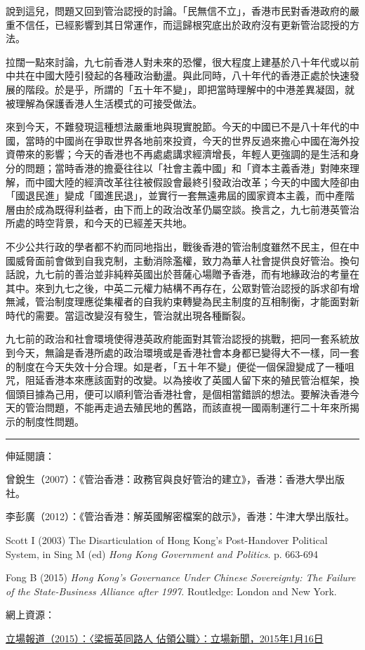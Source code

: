 說到這兒，問題又回到管治認授的討論。「民無信不立」，香港市民對香港政府的嚴重不信任，已經影響到其日常運作，而這歸根究底出於政府沒有更新管治認授的方法。

拉闊一點來討論，九七前香港人對未來的恐懼，很大程度上建基於八十年代或以前中共在中國大陸引發起的各種政治動盪。與此同時，八十年代的香港正處於快速發展的階段。於是乎，所謂的「五十年不變」，即把當時理解中的中港差異凝固，就被理解為保護香港人生活模式的可接受做法。

來到今天，不難發現這種想法嚴重地與現實脫節。今天的中國已不是八十年代的中國，當時的中國尚在爭取世界各地前來投資，今天的世界反過來擔心中國在海外投資帶來的影響；今天的香港也不再處處講求經濟增長，年輕人更強調的是生活和身分的問題；當時香港的擔憂往往以「社會主義中國」和「資本主義香港」對陣來理解，而中國大陸的經濟改革往往被假設會最終引發政治改革；今天的中國大陸卻由「國退民進」變成「國進民退」，並實行一套無遠弗屆的國家資本主義，而中產階層由於成為既得利益者，由下而上的政治改革仍屬空談。換言之，九七前港英管治所處的時空背景，和今天的已經差天共地。

不少公共行政的學者都不約而同地指出，戰後香港的管治制度雖然不民主，但在中國威脅面前會做到自我克制，主動消除濫權，致力為華人社會提供良好管治。換句話說，九七前的善治並非純粹英國出於菩薩心場贈予香港，而有地緣政治的考量在其中。來到九七之後，中英二元權力結構不再存在，公眾對管治認授的訴求卻有增無減，管治制度理應從集權者的自我約束轉變為民主制度的互相制衡，才能面對新時代的需要。當這改變沒有發生，管治就出現各種斷裂。

九七前的政治和社會環境使得港英政府能面對其管治認授的挑戰，把同一套系統放到今天，無論是香港所處的政治環境或是香港社會本身都已變得大不一樣，同一套的制度在今天失效十分合理。如是者，「五十年不變」便從一個保證變成了一種咀咒，阻延香港本來應該面對的改變。以為接收了英國人留下來的殖民管治框架，換個頭目據為己用，便可以順利管治香港社會，是個相當錯誤的想法。要解決香港今天的管治問題，不能再走過去殖民地的舊路，而該直視一國兩制運行二十年來所揭示的制度性問題。

\rule[-10pt]{15cm}{0.05em}

伸延閱讀：

曾銳生（2007）：《管治香港：政務官與良好管治的建立》，香港：香港大學出版社。

李彭廣（2012）：《管治香港：解英國解密檔案的啟示》，香港：牛津大學出版社。

Scott I (2003) The Disarticulation of Hong Kong’s Post-Handover Political System, in Sing M (ed) \textit{Hong Kong Government and Politics}. p. 663-694

Fong B (2015) \textit{Hong Kong’s Governance Under Chinese Sovereignty: The Failure of the State-Business Alliance after 1997}. Routledge: London and New York.

網上資源：

\href{https://thestandnews.com/politics/梁振英同路人-佔領公職/ }{立場報道（2015）：〈梁振英同路人 佔領公職〉：立場新聞，2015年1月16日}